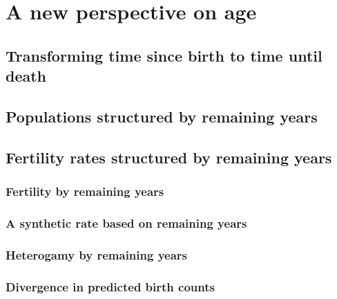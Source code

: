 \chapter{A new perspective on age}
  
  
  \section{Transforming time since birth to time until death}
    
    
  \section{Populations structured by remaining years}
    
  
  \section{Fertility rates structured by remaining years}
    
    
    \subsection{Fertility by remaining years}
      
      
    \subsection{A synthetic rate based on remaining years}
      
    
    \subsection{Heterogamy by remaining years}
      
      
    \subsection{Divergence in predicted birth counts}
      
      
